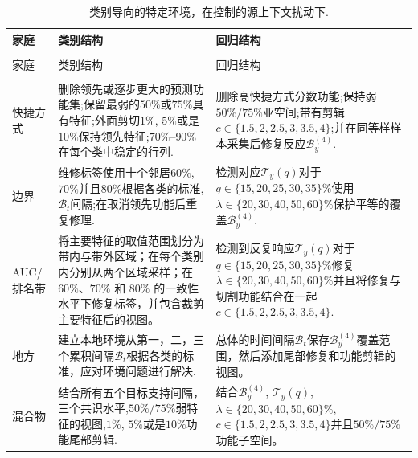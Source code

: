   \begin{longtable}{@{}>{\raggedright\arraybackslash}p{}
                      >{\raggedright\arraybackslash}p{}
                      >{\raggedright\arraybackslash}p{}@{}}
    \caption{类别导向的特定环境，在控制的源上下文扰动下.}
    \label{tab:specific-perturbation-contexts} \\
    \toprule 家庭&类别结构&回归结构\\
    \midrule
    \endfirsthead
    \multicolumn{3}{@{}l}{\tablename~\thetable\ （续）} \\
    \toprule 家庭&类别结构&回归结构\\
    \midrule
    \endhead
    \midrule
    \multicolumn{3}{r@{}}{在下一页继续} \\
    \endfoot
    \bottomrule
    \endlastfoot 快捷方式&删除领先或逐步更大的预测功能集;保留最弱的$50\%$或$75\%$具有特征;外面剪切$1\%$, $5\%$或是$10\%$保持领先特征;$70\%$--$90\%$在每个类中稳定的行列.
      &删除高快捷方式分数功能;保持弱$50\%/75\%$亚空间;带有剪辑$c\in\{1.5,2,2.5,3,3.5,4\}$;并在同等样样本采集后修复反应$\mathcal B_y^{(4)}$. \\
边界&维修标签使用十个邻居$60\%$, $70\%$并且$80\%$根据各类的标准,$\mathcal B_t$间隔;在取消领先功能后重复修理.
      &检测对应$\mathcal T_y(q)$对于$q\in\{15,20,25,30,35\}\%$使用$\lambda\in\{20,30,40,50,60\}\%$保护平等的覆盖$\mathcal B_y^{(4)}$. \\
AUC/\newline{}排名带&将主要特征的取值范围划分为带内与带外区域；在每个类别内分别从两个区域采样；在 $60\%$、$70\%$ 和 $80\%$ 的一致性水平下修复标签，并包含裁剪主要特征后的视图。
      &检测到反复响应$\mathcal T_y(q)$对于$q\in\{15,20,25,30,35\}\%$修复$\lambda\in\{20,30,40,50,60\}\%$并且将修复与切割功能结合在一起$c\in\{1.5,2,2.5,3,3.5,4\}$. \\
地方&建立本地环境从第一，二，三个累积间隔$\mathcal B_t$根据各类的标准，应对环境问题进行解决.&总体的时间间隔$\mathcal B_t$保存$\mathcal B_y^{(4)}$覆盖范围，然后添加尾部修复和功能剪辑的视图。\\
混合物&结合所有五个目标支持间隔，三个共识水平,$50\%/75\%$弱特征的视图,$1\%$, $5\%$或是$10\%$功能尾部剪辑.&结合$\mathcal B_y^{(4)}$, $\mathcal T_y(q)$,
        $\lambda\in\{20,30,40,50,60\}\%$,
        $c\in\{1.5,2,2.5,3,3.5,4\}$并且$50\%/75\%$功能子空间。\\
  \end{longtable}
\endgroup

